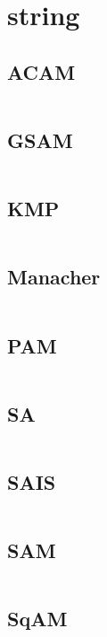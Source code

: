 \documentclass[a4]{article}
\begin{document}
\section{string}
\subsection{ACAM}
\inputminted[mathescape,linenos,numbersep=5pt,frame=lines,framesep=2mm]{cpp}{src/string/ACAM.cpp}
\subsection{GSAM}
\inputminted[mathescape,linenos,numbersep=5pt,frame=lines,framesep=2mm]{cpp}{src/string/GSAM.cpp}
\subsection{KMP}
\inputminted[mathescape,linenos,numbersep=5pt,frame=lines,framesep=2mm]{cpp}{src/string/KMP.cpp}
\subsection{Manacher}
\inputminted[mathescape,linenos,numbersep=5pt,frame=lines,framesep=2mm]{cpp}{src/string/Manacher.cpp}
\subsection{PAM}
\inputminted[mathescape,linenos,numbersep=5pt,frame=lines,framesep=2mm]{cpp}{src/string/PAM.cpp}
\subsection{SA}
\inputminted[mathescape,linenos,numbersep=5pt,frame=lines,framesep=2mm]{cpp}{src/string/SA.cpp}
\subsection{SAIS}
\inputminted[mathescape,linenos,numbersep=5pt,frame=lines,framesep=2mm]{cpp}{src/string/SAIS.cpp}
\subsection{SAM}
\inputminted[mathescape,linenos,numbersep=5pt,frame=lines,framesep=2mm]{cpp}{src/string/SAM.cpp}
\subsection{SqAM}
\inputminted[mathescape,linenos,numbersep=5pt,frame=lines,framesep=2mm]{cpp}{src/string/SqAM.cpp}
\end{document}
